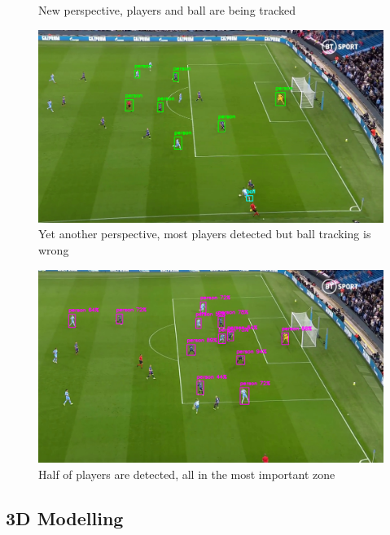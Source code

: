 \documentclass[
    11pt,
    twoside
]{report}
\begin{document}
\begin{appendices}
\begin{figure}[H]
    \caption{New perspective, players and ball are being tracked}
    \label{img:14}
\end{figure}
\begin{figure}[H]
    \includegraphics[keepaspectratio, width=\columnwidth]{Screenshot_2022-03-03_23-12-29.png}
    \caption{Yet another perspective, most players detected but ball tracking is wrong}
    \label{img:15}
\end{figure}
\begin{figure}[H]
    \includegraphics[keepaspectratio, width=\columnwidth]{Screenshot_2022-03-03_23-13-18.png}
    \caption{Half of players are detected, all in the most important zone}
    \label{img:16}
\end{figure}



\subsection{3D Modelling}




\end{appendices}
\end{document}
